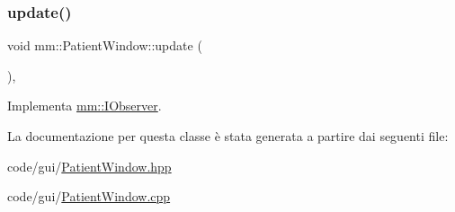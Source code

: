 \subsubsection{\texorpdfstring{update()}{update()}}
{\footnotesize\ttfamily void mm\+::\+Patient\+Window\+::update (\begin{DoxyParamCaption}{ }\end{DoxyParamCaption})\hspace{0.3cm}{\ttfamily [override]}, {\ttfamily [virtual]}}



Implementa \hyperlink{classmm_1_1_i_observer_a6422af04f8e9f3ba9d6d412a3bcdd03e}{mm\+::\+I\+Observer}.



La documentazione per questa classe è stata generata a partire dai seguenti file\+:\begin{DoxyCompactItemize}
\item 
code/gui/\hyperlink{_patient_window_8hpp}{Patient\+Window.\+hpp}\item 
code/gui/\hyperlink{_patient_window_8cpp}{Patient\+Window.\+cpp}\end{DoxyCompactItemize}
